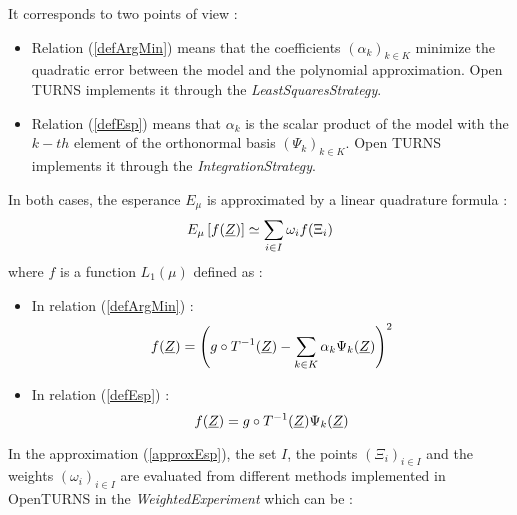 It corresponds to two points of view : 
\begin{itemize}
  \item Relation (\ref{defArgMin})  means that the coefficients $(\alpha_k)_{k \in K}$ minimize the quadratic error between  the model and the polynomial approximation. Open TURNS implements it through the \emph{LeastSquaresStrategy}.
  \item  Relation (\ref{defEsp}) means that  $\alpha_k$ is the scalar product of the model  with the $k-th$ element of the orthonormal basis $(\Psi_k)_{k \in K}$. Open TURNS implements it through the \emph{IntegrationStrategy}.
\end{itemize}

In both cases, the esperance $ E_{\mu}$ is approximated by a linear quadrature formula :
\begin{equation}\label{approxEsp}
E_{\mu} \left[ f({\underline{Z}}) \right] \simeq \sum_{i \in I} \omega_i f(\Xi_i)
\end{equation}
where $f$ is a function $L_1(\mu)$ defined as : 
\begin{itemize} 
  \item In relation (\ref{defArgMin}) : 
\begin{equation}\label{fArgMin} 
f({\underline{Z}}) = \left( g \circ T^{-1}({\underline{Z}}) -  \sum_{k \in K} \alpha_k \Psi_k ({\underline{Z}})\right)^2
\end{equation}
  \item In relation (\ref{defEsp}) : 
\begin{equation}\label{fEsp} 
f({\underline{Z}}) = g \circ T^{-1}({\underline{Z}}) \Psi_k ({\underline{Z}}) 
\end{equation}
\end{itemize}
In the approximation (\ref{approxEsp}), the set $I$, the points $(\Xi_i)_{i \in I}$ and the weights $(\omega_i)_{i \in I}$ are evaluated from different methods implemented in OpenTURNS in the \emph{WeightedExperiment} which can be : 
